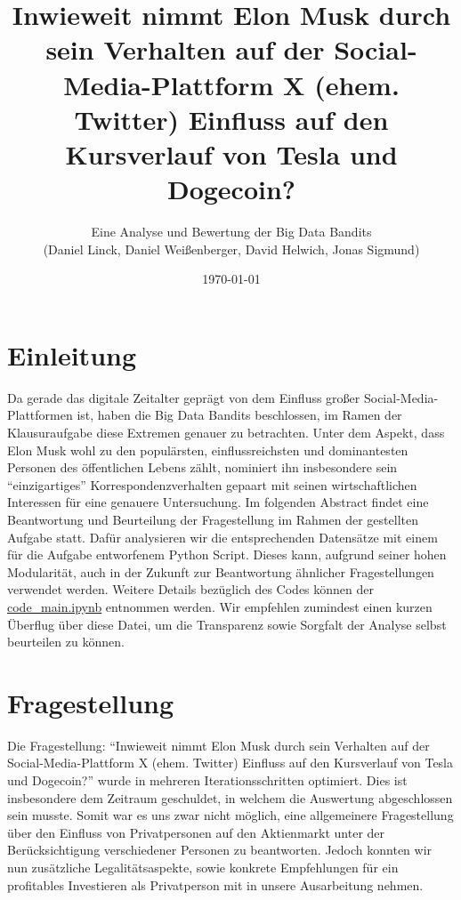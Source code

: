 \documentclass{article}
\title{\textbf {Inwieweit nimmt Elon Musk durch sein Verhalten auf der Social-Media-Plattform X (ehem. Twitter) Einfluss auf den Kursverlauf von Tesla und Dogecoin?}}
\author{Eine Analyse und Bewertung der Big Data Bandits \\ (Daniel Linck, Daniel Weißenberger, David Helwich, Jonas Sigmund)}
\date{\today}
\begin{document}
\maketitle

\tableofcontents
\newpage

\section{Einleitung}
Da gerade das digitale Zeitalter geprägt von dem Einfluss großer Social-Media-Plattformen ist, haben die Big Data Bandits beschlossen, im Ramen der Klausuraufgabe diese Extremen genauer zu betrachten.
Unter dem Aspekt, dass Elon Musk wohl zu den populärsten, einflussreichsten und dominantesten Personen des öffentlichen Lebens zählt, nominiert ihn insbesondere sein ``einzigartiges'' Korrespondenzverhalten gepaart mit seinen wirtschaftlichen Interessen für eine genauere Untersuchung.
Im folgenden Abstract findet eine Beantwortung und Beurteilung der Fragestellung im Rahmen der gestellten Aufgabe statt.
Dafür analysieren wir die entsprechenden Datensätze mit einem für die Aufgabe entworfenem Python Script.
Dieses kann, aufgrund seiner hohen Modularität, auch in der Zukunft zur Beantwortung ähnlicher Fragestellungen verwendet werden.
Weitere Details bezüglich des Codes können der \href{https://github.com/alphaname007/BigDataBandits/blob/17e158a26d8d1cc538102ff44e4171b609965e95/code\_main.ipynb}{code\_main.ipynb} entnommen werden.
Wir empfehlen zumindest einen kurzen Überflug über diese Datei, um die Transparenz sowie Sorgfalt der Analyse selbst beurteilen zu können.




\section{Fragestellung}
Die Fragestellung: ``Inwieweit nimmt Elon Musk durch sein Verhalten auf der Social-Media-Plattform X (ehem. Twitter) Einfluss auf den Kursverlauf von Tesla und Dogecoin?'' wurde in mehreren Iterationsschritten optimiert. 
Dies ist insbesondere dem Zeitraum geschuldet, in welchem die Auswertung abgeschlossen sein musste.
Somit war es uns zwar nicht möglich, eine allgemeinere Fragestellung über den Einfluss von Privatpersonen auf den Aktienmarkt unter der Berücksichtigung verschiedener Personen zu beantworten.
Jedoch konnten wir nun zusätzliche Legalitätsaspekte, sowie konkrete Empfehlungen für ein profitables Investieren als Privatperson mit in unsere Ausarbeitung nehmen.
\end{document}
